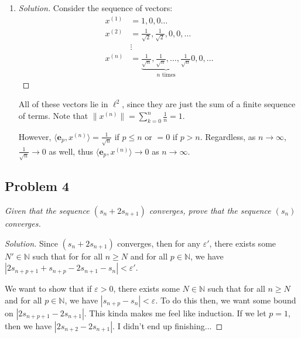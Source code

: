 \documentclass{article}
\newcommand{\N}{{\mathbb N}}
\newcommand{\ep}{{\varepsilon}}
\begin{document}
\begin{enumerate}
\begin{proof}[Solution]
		converge,
		so our limit laws tell us that their sum must also converge,
		and $R_k$ is just the square of a convergent sequence,
		and so $R_k$ must also converge.
		Additionally, in order for $x,y \in \ell^2$,
		we must have that $L_k$ converges.
		Thus, both of their $\limsup$s and $\liminf$s
		must equal each other, so we get
		\[
			\lim_{k\to\infty} L_k \leq \lim_{k\to\infty} R_k
		\]
		But extracting the definitions of $L_k$ and $R_k$,
		this is just
		\[
			\lim_{k\to\infty}\sqrt{\sum_{n=1}^k x_n + y_n} \leq
			\lim_{k\to\infty}\sqrt{\sum_{n=1}^k x^2_n} +
			\lim_{k\to\infty}\sqrt{\sum_{n=1}^k y^2_n}
		\]
		\[
			\implies \lVert x + y\rVert = \sqrt{\sum_{n=1}^\infty x_n + y_n}
			\leq \sqrt{\sum_{n=1}^\infty x^2_n} + \sqrt{\sum_{n=1}^\infty y^2_n}
			= \lVert x \rVert + \lVert y \rVert
		\]
	\end{proof}
	\item \begin{proof}[Solution]\let\qed\relax
		Consider the sequence of vectors:
		\begin{align*}
			x^{(1)} &= 1,0,0\dots\\
			x^{(2)} &= \frac{1}{\sqrt{2}}, \frac{1}{\sqrt{2}},0,0,\dots\\
					&\vdots\\
			x^{(n)} &= \underbrace{\frac{1}{\sqrt{n}}, \frac{1}{\sqrt{n}},
			\dots, \frac{1}{\sqrt{n}}}_{n \text{ times}}
			0,0,\dots
		\end{align*}
	\end{proof}
	All of these vectors lie in $\ell^2$,
	since they are just the sum of a finite sequence of terms.
	Note that $\lVert x^{(n)}\rVert = \sum_{k=0}^n \frac{1}{n} = 1$.

	However, $\langle \mathbf{e}_p, x^{(n)} \rangle = \frac{1}{\sqrt{n}}$
	if $p \leq n$ or $= 0$ if $p > n$.
	Regardless,
	as $n \to \infty$,
	$\frac{1}{\sqrt{n}} \to 0$ as well,
	thus $\langle \mathbf{e}_p, x^{(n)} \rangle \to 0$ as $n \to \infty$.
\end{enumerate}
\clearpage

\subsection*{Problem 4}
{\it Given that the sequence $(s_n + 2s_{n+1})$ converges,
prove that the sequence $(s_n)$ converges.}
\begin{proof}[Solution]\let\qed\relax
	Since $(s_n + 2s_{n+1})$ converges,
	then for any $\ep'$, there exists some $N' \in \N$
	such that for for all $n \geq N$ and for all $p \in \N$,
	we have $|2s_{n+p+1} + s_{n+p} - 2s_{n+1} - s_n| < \ep'$.

	We want to show that if $\ep > 0$,
	there exists some $N \in \N$ such that
	for all $n \geq N$ and for all $p \in \N$,
	we have $|s_{n+p} - s_n| < \ep$.
	To do this then, we want some bound on $|2s_{n+p+1} - 2s_{n+1}|$.
	This kinda makes me feel like induction.
	If we let $p = 1$, then we have $|2s_{n+2} - 2s_{n+1}|$.
	I didn't end up finishing...
\end{proof}
\clearpage
~\clearpage
\end{document}
